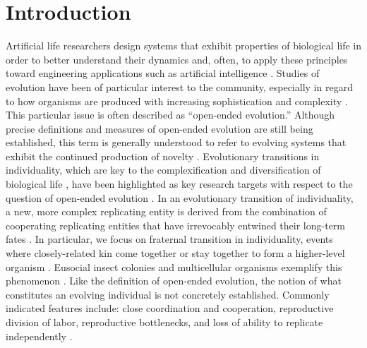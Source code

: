 \section{Introduction}

Artificial life researchers design systems that exhibit properties of biological life in order to better understand their dynamics and, often, to apply these principles toward engineering applications such as artificial intelligence \citep{bedau2003artificial}.
Studies of evolution have been of particular interest to the community, especially in regard to how organisms are produced with increasing sophistication and complexity \citep{goldsby2017increasing}.
This particular issue is often described as ``open-ended evolution.''
Although precise definitions and measures of open-ended evolution are still being established, this term is generally understood to refer to evolving systems that exhibit the continued production of novelty \citep{taylor2016open}.
Evolutionary transitions in individuality, which are key to the complexification and diversification of biological life \citep{smith1997major}, have been highlighted as key research targets with respect to the question of open-ended evolution \citep{ray1996evolving, banzhaf2016defining}.
In an evolutionary transition of individuality, a new, more complex replicating entity is derived from the combination of cooperating replicating entities that have irrevocably entwined their long-term fates \citep{west2015major}.
In particular, we focus on fraternal transition in individuality, events where closely-related kin come together or stay together to form a higher-level organism \citep{queller1997cooperators}.
Eusocial insect colonies and multicellular organisms exemplify this phenomenon \citep{smith1997major}.
Like the definition of open-ended evolution, the notion of what constitutes an evolving individual is not concretely established.
Commonly indicated features include:
close coordination and cooperation, reproductive division of labor, reproductive bottlenecks, and loss of ability to replicate independently
\citep{ereshefsky2015rethinking, bouchard2013symbiotic}.

